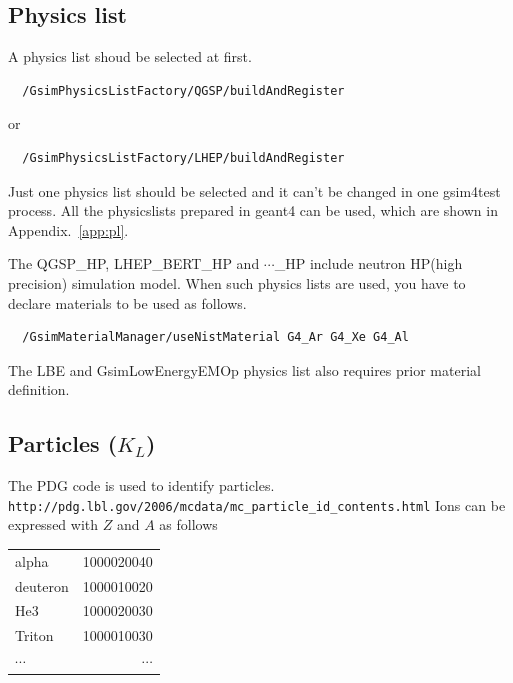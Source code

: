 \documentclass[a4paper,12pt]{article}
\begin{document}
 \subsection{Physics list}
 A physics list shoud be selected at first.
 \begin{screen}
  \begin{verbatim}
  /GsimPhysicsListFactory/QGSP/buildAndRegister \end{verbatim}
 \end{screen}
 or
 \begin{screen}
  \begin{verbatim}
  /GsimPhysicsListFactory/LHEP/buildAndRegister \end{verbatim}
 \end{screen}
 Just one physics list should be selected and
 it can't be changed in one gsim4test process.
 All the physicslists prepared in geant4 can be used, which are shown in
 Appendix.~\ref{app:pl}.

 The QGSP\_HP, LHEP\_BERT\_HP and $\cdots$\_HP include 
 neutron HP(high precision)  simulation model. When such physics lists
 are used, you have to declare materials to be used as follows.
 \begin{screen}
  \begin{verbatim}
  /GsimMaterialManager/useNistMaterial G4_Ar G4_Xe G4_Al\end{verbatim}
 \end{screen}
 The LBE and GsimLowEnergyEMOp physics list also requires prior material
 definition. 
 
 \subsection{Particles ($K_L$)}
 The PDG code is used to identify particles.
 {\tt http://pdg.lbl.gov/2006/mcdata/mc\_particle\_id\_contents.html}
 Ions can be expressed with $Z$ and $A$ as follows
 \begin{table}[H]
  \begin{tabular}{l|r}
   alpha    & 1000020040\\
   deuteron & 1000010020\\
   He3      & 1000020030\\
   Triton   & 1000010030\\
   $\cdots$&$\cdots$
  \end{tabular}
 \end{table}
\end{document}
